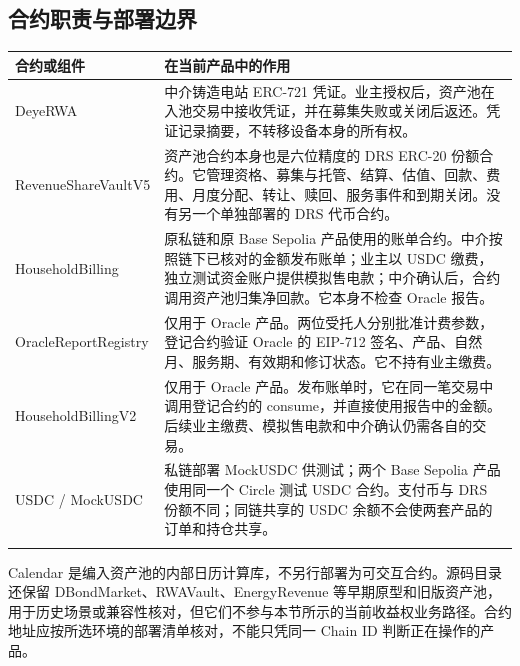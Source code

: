\documentclass[12pt,a4paper]{article}
\begin{document}
\subsection{合约职责与部署边界}
\begin{longtable}{L{4cm}L{10.5cm}}\toprule 合约或组件 & 在当前产品中的作用\\\midrule\endhead
DeyeRWA & 中介铸造电站 ERC-721 凭证。业主授权后，资产池在入池交易中接收凭证，并在募集失败或关闭后返还。凭证记录摘要，不转移设备本身的所有权。\\\addlinespace
RevenueShareVaultV5 & 资产池合约本身也是六位精度的 DRS ERC-20 份额合约。它管理资格、募集与托管、结算、估值、回款、费用、月度分配、转让、赎回、服务事件和到期关闭。没有另一个单独部署的 DRS 代币合约。\\\addlinespace
HouseholdBilling & 原私链和原 Base Sepolia 产品使用的账单合约。中介按照链下已核对的金额发布账单；业主以 USDC 缴费，独立测试资金账户提供模拟售电款；中介确认后，合约调用资产池归集净回款。它本身不检查 Oracle 报告。\\\addlinespace
OracleReportRegistry & 仅用于 Oracle 产品。两位受托人分别批准计费参数，登记合约验证 Oracle 的 EIP-712 签名、产品、自然月、服务期、有效期和修订状态。它不持有业主缴费。\\\addlinespace
HouseholdBillingV2 & 仅用于 Oracle 产品。发布账单时，它在同一笔交易中调用登记合约的 consume，并直接使用报告中的金额。后续业主缴费、模拟售电款和中介确认仍需各自的交易。\\\addlinespace
USDC / MockUSDC & 私链部署 MockUSDC 供测试；两个 Base Sepolia 产品使用同一个 Circle 测试 USDC 合约。支付币与 DRS 份额不同；同链共享的 USDC 余额不会使两套产品的订单和持仓共享。\\\addlinespace
\bottomrule\end{longtable}
Calendar 是编入资产池的内部日历计算库，不另行部署为可交互合约。源码目录还保留 DBondMarket、RWAVault、EnergyRevenue 等早期原型和旧版资产池，用于历史场景或兼容性核对，但它们不参与本节所示的当前收益权业务路径。合约地址应按所选环境的部署清单核对，不能只凭同一 Chain ID 判断正在操作的产品。
\end{document}
